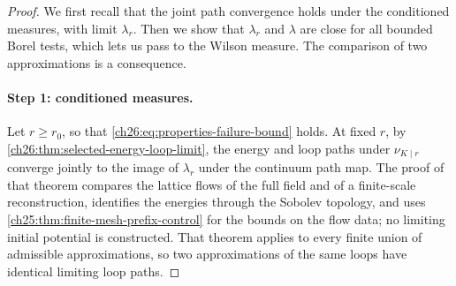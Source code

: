 \begin{proof}
We first recall that the joint path convergence holds under the conditioned measures, with limit $\lambda_r$. Then we show that $\lambda_r$ and $\lambda$ are close for all bounded Borel tests, which lets us pass to the Wilson measure. The comparison of two approximations is a consequence.

\paragraph{Step 1: conditioned measures.}
Let $r\ge r_0$, so that \eqref{ch26:eq:properties-failure-bound} holds. At fixed $r$, by \cref{ch26:thm:selected-energy-loop-limit}, the energy and loop paths under $\nu_{K\mid r}$ converge jointly to the image of $\lambda_r$ under the continuum path map. The proof of that theorem compares the lattice flows of the full field and of a finite-scale reconstruction, identifies the energies through the Sobolev topology, and uses \cref{ch25:thm:finite-mesh-prefix-control} for the bounds on the flow data; no limiting initial potential is constructed. That theorem applies to every finite union of admissible approximations, so two approximations of the same loops have identical limiting loop paths.


\end{proof}
